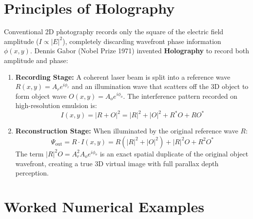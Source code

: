 \section{Principles of Holography}
Conventional 2D photography records only the square of the electric field amplitude ($I \propto |E|^2$), completely discarding wavefront phase information $\phi(x,y)$. Dennis Gabor (Nobel Prize 1971) invented \textbf{Holography} to record both amplitude and phase:
\begin{enumerate}[leftmargin=*,itemsep=2pt]
    \item \textbf{Recording Stage:} A coherent laser beam is split into a reference wave $R(x,y) = A_r e^{i\phi_r}$ and an illumination wave that scatters off the 3D object to form object wave $O(x,y) = A_o e^{i\phi_o}$. The interference pattern recorded on high-resolution emulsion is:
    \begin{equation}
    I(x,y) = |R + O|^2 = |R|^2 + |O|^2 + R^* O + R O^*
    \end{equation}
    \item \textbf{Reconstruction Stage:} When illuminated by the original reference wave $R$:
    \begin{equation}
    \Psi_{\text{out}} = R \cdot I(x,y) = R(|R|^2 + |O|^2) + |R|^2 O + R^2 O^*
    \end{equation}
    The term $|R|^2 O = A_r^2 A_o e^{i\phi_o}$ is an exact spatial duplicate of the original object wavefront, creating a true 3D virtual image with full parallax depth perception.
\end{enumerate}

\section{Worked Numerical Examples}

